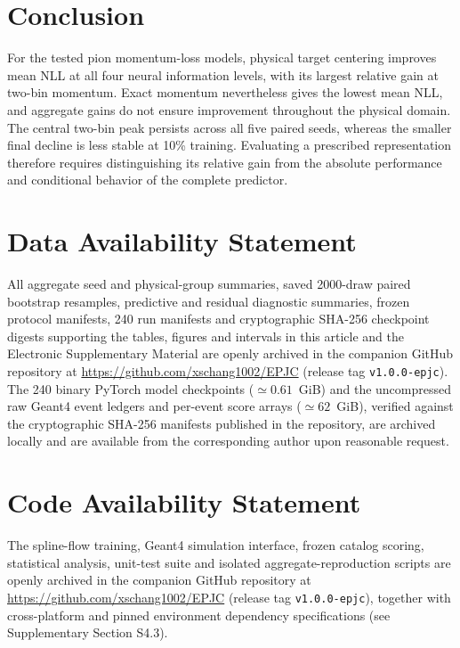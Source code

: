 \documentclass[twocolumn,epjc3]{svjour3}
\begin{document}
\section{Conclusion}
\label{sec:conclusion}

For the tested pion momentum-loss models, physical target centering improves
mean NLL at all four neural information levels, with its largest relative
gain at two-bin momentum. Exact momentum nevertheless gives the lowest mean NLL, and aggregate gains do not ensure improvement throughout the
physical domain. The central two-bin peak persists across all five paired
seeds, whereas the smaller final decline is less stable at 10\% training.
Evaluating a prescribed representation therefore requires distinguishing its
relative gain from the absolute performance and conditional behavior of the
complete predictor.


\section*{Data Availability Statement}
All aggregate seed and physical-group summaries, saved 2000-draw paired
bootstrap resamples, predictive and residual diagnostic summaries, frozen
protocol manifests, 240 run manifests and cryptographic SHA-256 checkpoint
digests supporting the tables, figures and intervals in this article and the
Electronic Supplementary Material are openly archived in the companion GitHub
repository at \url{https://github.com/xschang1002/EPJC} (release tag
\texttt{v1.0.0-epjc}). The 240 binary PyTorch model checkpoints
($\simeq 0.61$~GiB) and the uncompressed raw Geant4 event ledgers and
per-event score arrays ($\simeq 62$~GiB), verified against the cryptographic
SHA-256 manifests published in the repository, are archived locally and are
available from the corresponding author upon reasonable request.

\section*{Code Availability Statement}
The spline-flow training, Geant4 simulation interface, frozen catalog scoring,
statistical analysis, unit-test suite and isolated aggregate-reproduction
scripts are openly archived in the companion GitHub repository at
\url{https://github.com/xschang1002/EPJC} (release tag \texttt{v1.0.0-epjc}),
together with cross-platform and pinned environment dependency specifications
(see Supplementary Section S4.3).
\end{document}
